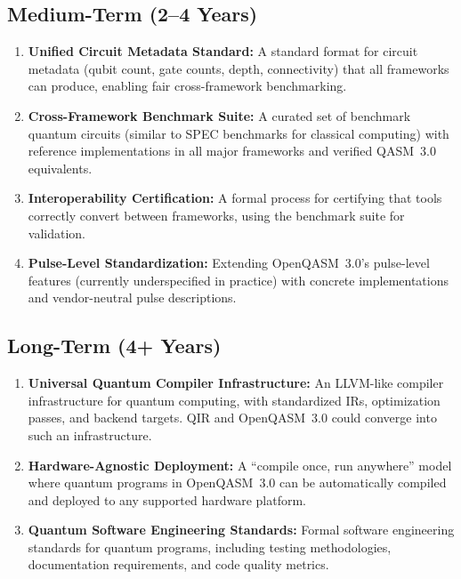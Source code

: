 \documentclass[journal]{IEEEtran}
\begin{document}
\subsection{Medium-Term (2--4 Years)}

\begin{enumerate}
    \item \textbf{Unified Circuit Metadata Standard:} A standard format for circuit metadata (qubit count, gate counts, depth, connectivity) that all frameworks can produce, enabling fair cross-framework benchmarking.

    \item \textbf{Cross-Framework Benchmark Suite:} A curated set of benchmark quantum circuits (similar to SPEC benchmarks for classical computing) with reference implementations in all major frameworks and verified QASM~3.0 equivalents.

    \item \textbf{Interoperability Certification:} A formal process for certifying that tools correctly convert between frameworks, using the benchmark suite for validation.

    \item \textbf{Pulse-Level Standardization:} Extending OpenQASM~3.0's pulse-level features (currently underspecified in practice) with concrete implementations and vendor-neutral pulse descriptions.
\end{enumerate}

\subsection{Long-Term (4+ Years)}

\begin{enumerate}
    \item \textbf{Universal Quantum Compiler Infrastructure:} An LLVM-like compiler infrastructure for quantum computing, with standardized IRs, optimization passes, and backend targets. QIR and OpenQASM~3.0 could converge into such an infrastructure.

    \item \textbf{Hardware-Agnostic Deployment:} A ``compile once, run anywhere'' model where quantum programs in OpenQASM~3.0 can be automatically compiled and deployed to any supported hardware platform.

    \item \textbf{Quantum Software Engineering Standards:} Formal software engineering standards for quantum programs, including testing methodologies, documentation requirements, and code quality metrics.
\end{enumerate}
\end{document}

